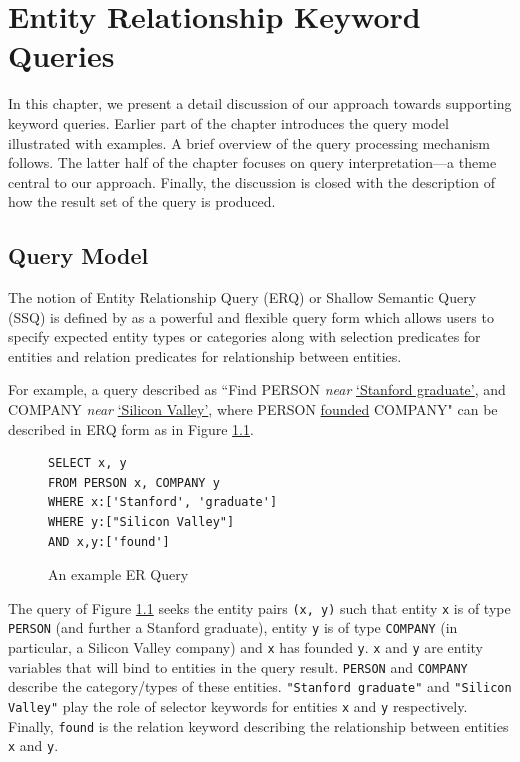\documentclass[a4paper, twoside, 12pt]{report}
\begin{document}

\chapter[ER Keyword Querying]{Entity Relationship Keyword Queries}

In this chapter, we present a detail discussion of our approach towards supporting keyword queries. Earlier part of the chapter introduces the query model illustrated with examples. A brief overview of the query processing mechanism follows. The latter half of the chapter focuses on query interpretation---a theme central to our approach. Finally, the discussion is closed with the description of how the result set of the query is produced.

\section{Query Model}

The notion of Entity Relationship Query (ERQ) or Shallow Semantic Query (SSQ) is defined by \cite{li2010structured, li2012entity} as a powerful and flexible query form which allows users to specify expected entity types or categories along with selection predicates for entities and relation predicates for relationship between entities.

For example, a query described as ``Find PERSON \emph{near} \underline{`Stanford graduate'}, and COMPANY \emph{near} \underline{`Silicon Valley'}, where PERSON \underline{founded} COMPANY" can be described in ERQ form as in Figure \ref{fig:erq}.

\begin{figure}[h!]
\centering
\begin{BVerbatim}
SELECT x, y
FROM PERSON x, COMPANY y
WHERE x:['Stanford', 'graduate']
WHERE y:["Silicon Valley"]
AND x,y:['found']
\end{BVerbatim}
\caption{An example ER Query}
\label{fig:erq}
\end{figure}

The query of Figure \ref{fig:erq} seeks the entity pairs \texttt{(x, y)} such that entity \texttt{x} is of type \texttt{PERSON} (and further a Stanford graduate), entity \texttt{y} is of type \texttt{COMPANY} (in particular, a Silicon Valley company) and \texttt{x} has founded \texttt{y}. \texttt{x} and \texttt{y} are entity variables that will bind to entities in the query result. \texttt{PERSON} and \texttt{COMPANY} describe the category/types of these entities. \texttt{"Stanford graduate"} and \texttt{"Silicon Valley"} play the role of selector keywords for entities \texttt{x} and \texttt{y} respectively. Finally, \texttt{found} is the relation keyword describing the relationship between entities \texttt{x} and \texttt{y}.
\end{document}
